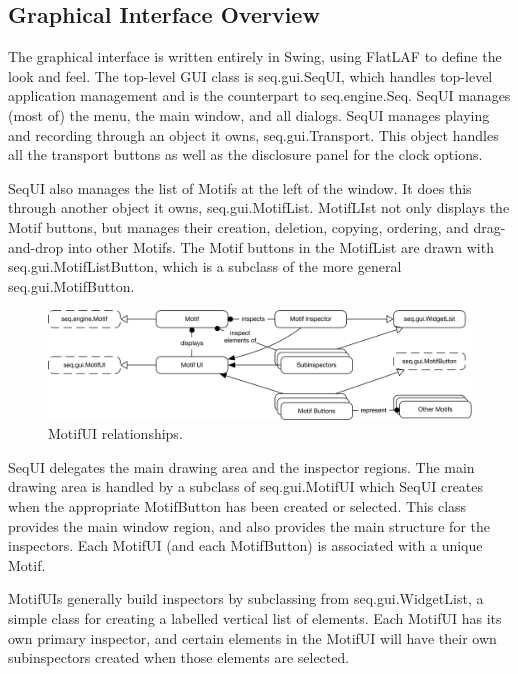 \documentclass[twoside,10pt]{article}
\begin{document}
\subsection{Graphical Interface Overview}

The graphical interface is written entirely in Swing, using FlatLAF to define the look and feel.  The top-level GUI class is {\sf seq.gui.SeqUI}, which handles top-level application management and is the counterpart to {\sf seq.engine.Seq}.  SeqUI manages (most of) the menu, the main window, and all dialogs.  SeqUI manages playing and recording through an object it owns, {\sf seq.gui.Transport}.  This object handles all the transport buttons as well as the disclosure panel for the clock options.

SeqUI also manages the list of Motifs at the left of the window.  It does this through another object it owns, {\sf seq.gui.MotifList}.  MotifLIst not only displays the Motif buttons, but manages their creation, deletion, copying, ordering, and drag-and-drop into other Motifs.  The Motif buttons in the MotifList are drawn with {\sf seq.gui.MotifListButton}, which is a subclass of the more general {\sf seq.gui.MotifButton}.

\begin{figure}[t]
\centering
\includegraphics[width=5in]{inspectors}
\caption{MotifUI relationships.}
\label{inspectorsdev}
\end{figure}

SeqUI delegates the main drawing area and the inspector regions.  The main drawing area is handled by a subclass of {\sf seq.gui.MotifUI} which SeqUI creates when the appropriate MotifButton has been created or selected.  This class provides the main window region, and also provides the main structure for the inspectors.  Each MotifUI (and each MotifButton) is associated with a unique Motif.

MotifUIs generally build inspectors by subclassing from {\sf seq.gui.WidgetList}, a simple class for creating a labelled vertical list of elements.  Each MotifUI has its own primary inspector, and certain elements in the MotifUI will have their own subinspectors created when those elements are selected. 
\end{document}
